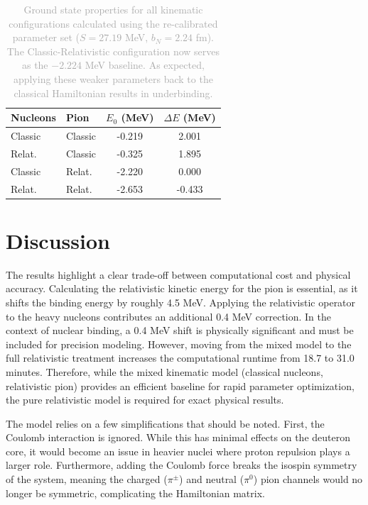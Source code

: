 \documentclass[a4paper,oneside,article,12pt]{memoir}
\begin{document}
\begin{table}[H]
    \centering
    \renewcommand{\arraystretch}{1.2}
    \begin{tabular}{ll cc}
        \hline
        \textbf{Nucleons} & \textbf{Pion} & \textbf{$E_0$ (MeV)} & \textbf{$\Delta E$ (MeV)} \\
        \hline
        Classic & Classic & -0.219 &    2.001 \\
        Relat.  & Classic & -0.325 &    1.895 \\
        Classic & Relat.  & -2.220 &    0.000 \\
        Relat.  & Relat.  & -2.653 &   -0.433 \\
        \hline
    \end{tabular}
    \caption{\textcolor{darkgray}{Ground state properties for all kinematic configurations calculated using the re-calibrated parameter set ($S = 27.19$ MeV, $b_N = 2.24$ fm). The Classic-Relativistic configuration now serves as the $-2.224$ MeV baseline. As expected, applying these weaker parameters back to the classical Hamiltonian results in underbinding.}}
    \label{tab:recal_kinematics}
\end{table}

\newpage
\chapter{Discussion}
The results highlight a clear trade-off between computational cost and physical accuracy. Calculating the relativistic kinetic energy for the pion is essential, as it shifts the binding energy by roughly 4.5 MeV. Applying the relativistic operator to the heavy nucleons contributes an additional 0.4 MeV correction. In the context of nuclear binding, a 0.4 MeV shift is physically significant and must be included for precision modeling. However, moving from the mixed model to the full relativistic treatment increases the computational runtime from 18.7 to 31.0 minutes. Therefore, while the mixed kinematic model (classical nucleons, relativistic pion) provides an efficient baseline for rapid parameter optimization, the pure relativistic model is required for exact physical results.

The model relies on a few simplifications that should be noted. First, the Coulomb interaction is ignored. While this has minimal effects on the deuteron core, it would become an issue in heavier nuclei where proton repulsion plays a larger role. Furthermore, adding the Coulomb force breaks the isospin symmetry of the system, meaning the charged ($\pi^\pm$) and neutral ($\pi^0$) pion channels would no longer be symmetric, complicating the Hamiltonian matrix. 
\end{document}
